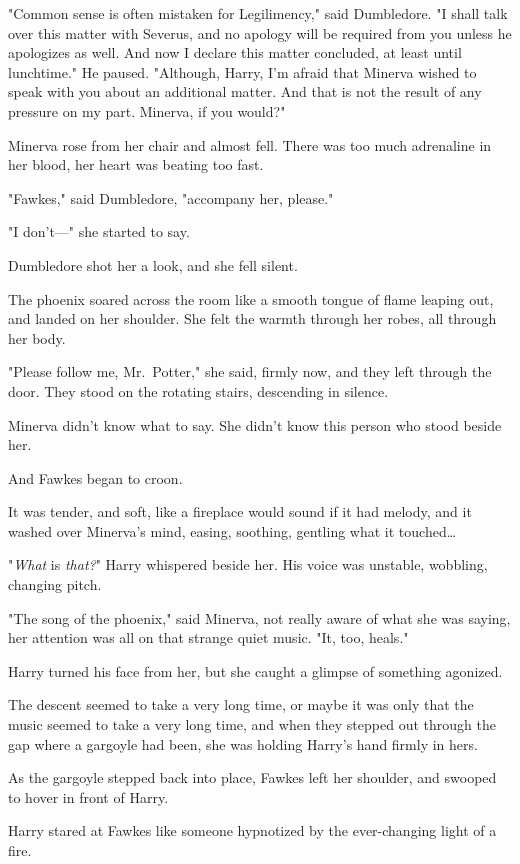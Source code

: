 "Common sense is often mistaken for Legilimency," said Dumbledore. "I shall 
talk over this matter with Severus, and no apology will be required from you 
unless he apologizes as well. And now I declare this matter concluded, at least 
until lunchtime." He paused. "Although, Harry, I'm afraid that Minerva wished 
to speak with you about an additional matter. And that is not the result of any 
pressure on my part. Minerva, if you would?"

Minerva rose from her chair and almost fell. There was too much adrenaline in 
her blood, her heart was beating too fast.

"Fawkes," said Dumbledore, "accompany her, please."

"I don't---" she started to say.

Dumbledore shot her a look, and she fell silent.

The phoenix soared across the room like a smooth tongue of flame leaping out, 
and landed on her shoulder. She felt the warmth through her robes, all through 
her body.

"Please follow me, Mr.~Potter," she said, firmly now, and they left through the 
door.
\sbreak
They stood on the rotating stairs, descending in silence.

Minerva didn't know what to say. She didn't know this person who stood beside 
her.

And Fawkes began to croon.

It was tender, and soft, like a fireplace would sound if it had melody, and it 
washed over Minerva's mind, easing, soothing, gentling what it touched{\ldots}

"\emph{What} is \emph{that?}" Harry whispered beside her. His voice was 
unstable, wobbling, changing pitch.

"The song of the phoenix," said Minerva, not really aware of what she was 
saying, her attention was all on that strange quiet music. "It, too, heals."

Harry turned his face from her, but she caught a glimpse of something agonized.

The descent seemed to take a very long time, or maybe it was only that the 
music seemed to take a very long time, and when they stepped out through the 
gap where a gargoyle had been, she was holding Harry's hand firmly in hers.

As the gargoyle stepped back into place, Fawkes left her shoulder, and swooped 
to hover in front of Harry.

Harry stared at Fawkes like someone hypnotized by the ever-changing light of a 
fire.


